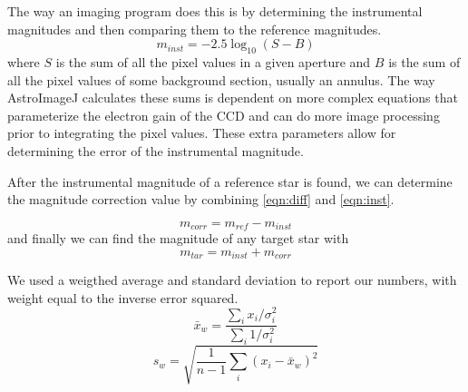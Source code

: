 \documentclass[%
aip,
jmp,
reprint,
floatfix
]{revtex4-1}
\begin{document}
	The way an imaging program does this is by determining the instrumental magnitudes and then comparing them to the reference magnitudes. 
	\begin{equation}
	 	m_{inst} = -2.5 \log_{10}(S-B)
	 	\label{eqn:inst}
	\end{equation}
	where $S$ is the sum of all the pixel values in a given aperture and $B$ is the sum of all the pixel values of some background section, usually an annulus. The way AstroImageJ calculates these sums is dependent on more complex equations that parameterize the electron gain of the CCD and can do more image processing prior to integrating the pixel values. These extra parameters allow for determining the error of the instrumental magnitude.
	
	After the instrumental magnitude of a reference star is found, we can determine the magnitude correction value by combining \autoref{eqn:diff} and \autoref{eqn:inst}.
	
	\begin{equation}
		m_{corr} = m_{ref} - m_{inst}
		\label{eqn:corrected}
	\end{equation}
	and finally we can find the magnitude of any target star with 
	\begin{equation}
		m_{tar} = m_{inst} + m_{corr}
		\label{eqn:final}
	\end{equation}
	
	We used a weigthed average and standard deviation to report our numbers, with weight equal to the inverse error squared.
	\begin{equation}
	 	\bar{x}_w = \frac{\sum_i{x_i/\sigma_i^2}}{\sum_i{1/\sigma_i^2}}
	 	\label{eqn:wa}
	\end{equation}
	\begin{equation}
	s_w = \sqrt{\frac{1}{n-1} \sum_i{(x_i -\bar{x}_w)^2}}
	\label{eqn:ws}
	\end{equation}
	


\end{document}
